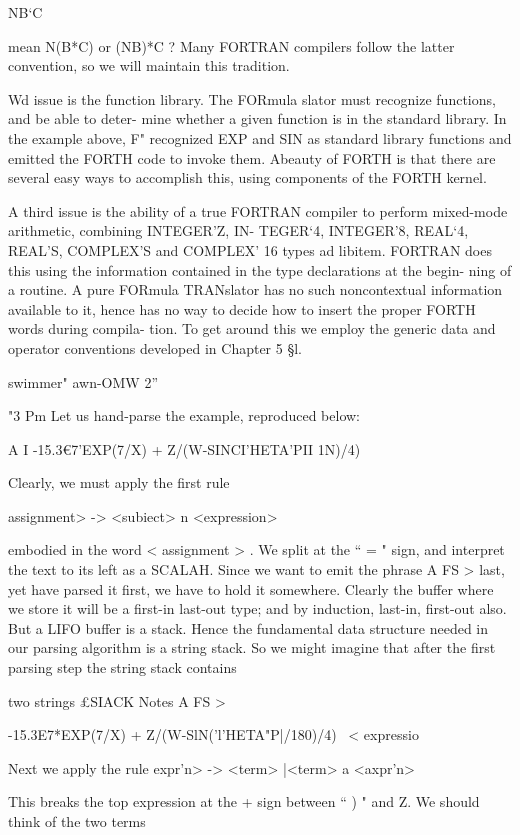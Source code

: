 NB‘C

mean N(B*C) or (NB)*C ? Many FORTRAN compilers follow
the latter convention, so we will maintain this tradition.

Wd issue is the function library. The FORmula
slator must recognize functions, and be able to deter-
mine whether a given function is in the standard library. In the
example above, F" recognized EXP and SIN as standard library
functions and emitted the FORTH code to invoke them. Abeauty
of FORTH is that there are several easy ways to accomplish this,
using components of the FORTH kernel.

A third issue is the ability of a true FORTRAN compiler to
perform mixed-mode arithmetic, combining INTEGER'Z, IN-
TEGER‘4, INTEGER'8, REAL‘4, REAL'S, COMPLEX'S
and COMPLEX' 16 types ad libitem. FORTRAN does this using
the information contained in the type declarations at the begin-
ning of a routine. A pure FORmula TRANslator has no such
noncontextual information available to it, hence has no way to
decide how to insert the proper FORTH words during compila-
tion. To get around this we employ the generic data and operator
conventions developed in Chapter 5 §l.

swimmer" awn-OMW 2”

"3 Pm
Let us hand-parse the example, reproduced below:

A I -15.3€7'EXP(7/X) + Z/(W-SINCI'HETA'PII 1N)/4)

Clearly, we must apply the first rule

\<assignment> -> <subiect> n <expression>

embodied in the word < assignment > . We split at the “ = " sign,
and interpret the text to its left as a SCALAH. Since we want to
emit the phrase A FS > last, yet have parsed it first, we have to
hold it somewhere. Clearly the buffer where we store it will be a
first-in last-out type; and by induction, last-in, first-out also. But
a LIFO buffer is a stack. Hence the fundamental data structure
needed in our parsing algorithm is a string stack. So we might
imagine that after the first parsing step the string stack contains

 

two strings
£SIACK Notes
A FS > \ < subject >

-15.3E7*EXP(7/X) + Z/(W-SlN('l’HETA"P|/180)/4) \ < expressio

Next we apply the rule
\<expr'n> -> <term> |<term> a <axpr'n>

This breaks the top expression at the + sign between “ ) " and Z.
We should think of the two terms

